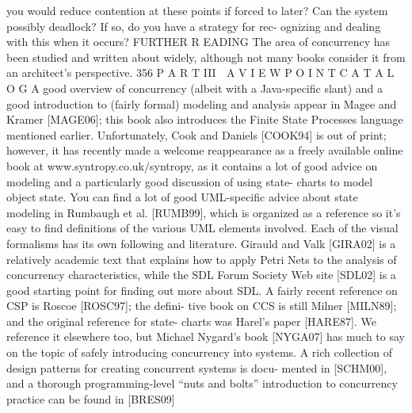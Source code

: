 you would reduce contention at these points if forced to later?
Can the system possibly deadlock? If so, do you have a strategy for rec-
ognizing and dealing with this when it occurs?
FURTHER R EADING
The area of concurrency has been studied and written about widely, although
not many books consider it from an architect’s perspective.
356
 P A R T III  A V I E W P O I N T C A T A L O G
A good overview of concurrency (albeit with a Java-specific slant) and a
good introduction to (fairly formal) modeling and analysis appear in Magee
and Kramer [MAGE06]; this book also introduces the Finite State Processes
language mentioned earlier. Unfortunately, Cook and Daniels [COOK94] is
out of print; however, it has recently made a welcome reappearance as a freely
available online book at www.syntropy.co.uk/syntropy, as it contains a lot of
good advice on modeling and a particularly good discussion of using state-
charts to model object state. You can find a lot of good UML-specific advice
about state modeling in Rumbaugh et al. [RUMB99], which is organized as a
reference so it’s easy to find definitions of the various UML elements
involved.
Each of the visual formalisms has its own following and literature.
Girauld and Valk [GIRA02] is a relatively academic text that explains how to
apply Petri Nets to the analysis of concurrency characteristics, while the SDL
Forum Society Web site [SDL02] is a good starting point for finding out more
about SDL. A fairly recent reference on CSP is Roscoe [ROSC97]; the defini-
tive book on CCS is still Milner [MILN89]; and the original reference for state-
charts was Harel’s paper [HARE87].
We reference it elsewhere too, but Michael Nygard’s book [NYGA07] has
much to say on the topic of safely introducing concurrency into systems. A
rich collection of design patterns for creating concurrent systems is docu-
mented in [SCHM00], and a thorough programming-level “nuts and bolts”
introduction to concurrency practice can be found in [BRES09]